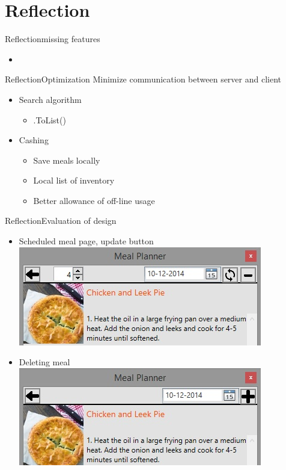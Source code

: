\section{Reflection}

\begin{frame}{Reflection}{missing features}%
	\begin{itemize}
		\item
	\end{itemize}
\end{frame}

\begin{frame}{Reflection}{Optimization}
	Minimize communication between server and client
	\begin{itemize}
		\item Search algorithm
		\begin{itemize}
			\item .ToList()
		\end{itemize}
		\item Cashing
		\begin{itemize}
			\item Save meals locally
			\item Local list of inventory
			\item Better allowance of off-line usage
		\end{itemize}
	\end{itemize}
\end{frame}

\begin{frame}{Reflection}{Evaluation of design}
	\begin{itemize}
		\item Scheduled meal page, update button
		\newline \includegraphics[scale=0.4]{./graphics/datepicker}
		\item Deleting meal
		\newline \includegraphics[scale=0.4]{./graphics/datepicker-not-planned}
	\end{itemize}
\end{frame}


